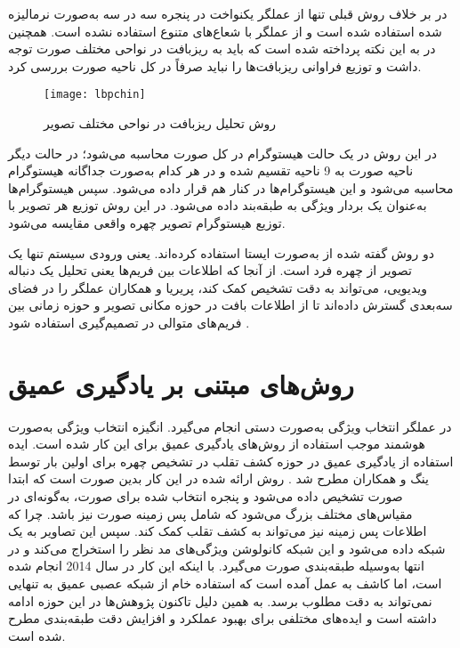 در 
\cite{chingovska2012effectiveness}
بر خلاف روش قبلی تنها از عملگر  یکنواخت در پنجره سه در سه به‌صورت نرمالیزه شده استفاده شده است و از عملگر  با شعاع‌های متنوع 
\cite{maatta2011face}
استفاده نشده است. همچنین در 
\cite{chingovska2012effectiveness}
به این نکته پرداخته شده است که باید به ریزبافت در نواحی مختلف صورت توجه داشت و توزیع فراوانی ریزبافت‌ها را نباید صرفاً در کل ناحیه صورت بررسی کرد.
\begin{figure}[t]
	\centerline{\texttt{[image: lbpchin]}}
	\caption{روش تحلیل ریزبافت در نواحی مختلف تصویر \cite{chingovska2012effectiveness}}
	\label{fig:lbpchin}
\end{figure}
در این روش در یک حالت هیستوگرام  در کل صورت محاسبه می‌شود؛ در حالت دیگر ناحیه صورت به 9 ناحیه تقسیم شده و در هر کدام به‌صورت جداگانه هیستوگرام  محاسبه می‌شود و این هیستوگرام‌ها در کنار هم قرار داده می‌شود. سپس هیستوگرام‌ها به‌عنوان یک بردار ویژگی به طبقه‌بند داده می‌شود. در این روش توزیع هر تصویر با توزیع هیستوگرام تصویر چهره واقعی مقایسه می‌شود.

دو روش گفته شده از  به‌صورت ایستا استفاده کرده‌اند. یعنی ورودی سیستم تنها یک تصویر از چهره فرد است. از آنجا که اطلاعات بین فریم‌ها یعنی تحلیل یک دنباله ویدیویی، می‌تواند به دقت تشخیص کمک کند، پریریا و همکاران عملگر  را در فضای سه‌بعدی گسترش داده‌اند تا از اطلاعات بافت در حوزه مکانی تصویر و حوزه زمانی بین فریم‌های متوالی در تصمیم‌گیری استفاده شود
\cite{freitas2012lbp}.
\section{روش‌های مبتنی بر یادگیری عمیق}
 در عملگر  انتخاب ویژگی به‌صورت دستی انجام می‌گیرد. انگیزه انتخاب ویژگی به‌صورت هوشمند موجب استفاده از روش‌های یادگیری عمیق برای این کار شده است. ایده استفاده از یادگیری عمیق در حوزه کشف تقلب در تشخیص چهره برای اولین بار توسط ینگ و همکاران مطرح شد 
\cite{yang2014learn}.
 روش ارائه شده در این کار بدین صورت است که ابتدا صورت تشخیص داده می‌شود و پنجره انتخاب شده برای صورت، به‌گونه‌ای در مقیاس‌های مختلف بزرگ می‌شود که شامل پس زمینه صورت نیز باشد. چرا که اطلاعات پس زمینه نیز می‌تواند به کشف تقلب کمک کند. سپس این تصاویر به یک شبکه 
\cite{krizhevsky2012imagenet}
  داده می‌شود و این شبکه کانولوشن ویژگی‌های مد نظر را استخراج می‌کند و در انتها به‌وسیله  طبقه‌بندی صورت می‌گیرد. با اینکه این کار در سال 2014 انجام شده است، اما کاشف به عمل آمده است که استفاده خام از شبکه عصبی عمیق به تنهایی نمی‌تواند به دقت مطلوب برسد. به همین دلیل تاکنون پژوهش‌ها در این حوزه ادامه داشته است و ایده‌های مختلفی برای بهبود عملکرد و افزایش دقت طبقه‌بندی مطرح شده است. 
 
